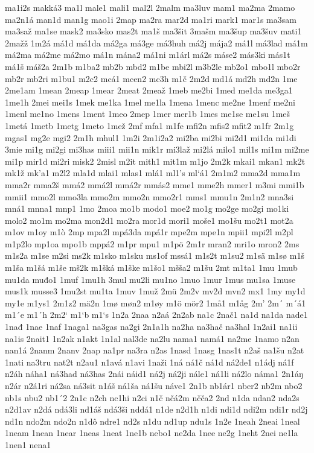 ma1i2s
makká3
ma1l
male1
mali1
mal2l
2malm
ma3luv
mam1
ma2ma
2mamo
ma2n1á
man1d
man1g
mao1i
2map
ma2ra
mar2d
ma1ri
mark1
mar1s
ma3sam
ma3saž
ma1se
mask2
ma3sko
mas2t
ma1š
ma3šit
3mašm
ma3šup
ma3šuv
mati1
2mažž
1m2á
má1d
má1da
má2ga
má3ge
má3huh
má2j
mája2
má1l
má3lad
má1m
má2ma
má2me
má2mo
má1n
mána2
má1ni
m1árl
má2s
máse2
más3ki
más1t
má1š
máš2a
2m1b
m1ba2
mb2b
mbd2
m1be
mbi2l
m3b2le
mb2o1
mbo1l
mbo2r
mb2r
mb2ri
m1bu1
m2c2
mcá1
mcen2
mc3h
m1č
2m2d
md1á
md2h
md2n
1me
2me1am
1mean
2meap
1mear
2meat
2meaž
1meb
me2bi
1med
me1da
me3ga1
1me1h
2mei
mei1s
1mek
me1ka
1mel
me1la
1mena
1menc
me2ne
1menf
me2ni
1menl
me1no
1mens
1ment
1meo
2mep
1mer
mer1b
1mes
me1se
me1su
1meš
1metá
1metb
1metg
1meto
1mež
2mf
mfa1
m1fe
mfi2n
mfis2
mfit2
m1fr
2m1g
mgas1
mg2e
mgi2
2m1h
mhul1
1m2i
2m1i2a2
mi2ba
mi2bi
mi2d1
mi1da
mi1di
3mie
mi1g
mi2gi
mi3has
miii1
mii1n
mik1r
mi3laž
mi2lá
milo1
mil1s
mi1m
mi2me
mi1p
mir1d
mi2ri
misk2
2misl
m2it
mith1
mit1m
m1jo
2m2k
mkai1
mkan1
mk2t
mk1ž
mk'a1
m2l2
mla1d
mlai1
mlas1
mlá1
ml1's
ml`á1
2m1m2
mma2d
mma1m
mma2r
mma2š
mmá2
mmá2l
mmá2r
mmás2
mme1
mme2h
mmer1
m3mi
mmi1b
mmii1
mmo2l
mmo3la
mmo2m
mmo2n
mmo2r1
mms1
mmu1n
2m1n2
mna3si
mná1
mnna1
mnp1
1mo
2moa
mo1b
modo1
moe2
mo1g
mo2ge
mo2gi
mo1ki
molo2
mo1m
mo2ma
mon2d1
mo2ra
mor1d
mori1
moše1
mo1šu
mo2t1
mot2a
m1ov
m1oy
m1ò
2mp
mpa2l
mpá3da
mpá1r
mpe2m
mpe1n
mpii1
mpi2l
m2pl
m1p2lo
mp1oa
mpo1b
mppá2
m1pr
mpu1
m1pö
2m1r
mran2
mri1o
mron2
2ms
m1s2a
m1se
m2si
ms2k
m1sko
m1sku
ms1of
mssá1
m1s2t
m1su2
m1sä
m1sø
m1š
m1ša
m1šá
m1še
mš2k
m1šká
m1ške
m1šo1
mšša2
m1šu
2mt
m1ta1
1mu
1mub
mu1da
muđo1
1muf
1mu1h
3mul
mu2li
mu1no
1muo
1mur
1mus
mu1sa
1muse
mus1k
musse3
1mu2st
mu1ta
1muv
1muž
2mü
2m2v
mv2d
mvn2
mx1
1my
my1d
my1e
m1ys1
2m1z2
mä2n
1mø
møn2
m1øy
m1ö
mör2
1må1
m1åg
2m'
2m´
m´á1
m1´e
m1´h
2m2`
m1`b
m1`s
1n2a
2naa
n2aá
2n2ab
na1c
2nač1
na1d
na1da
nade1
1nađ
1nae
1naf
1naga1
na3gas
na2gi
2n1a1h
na2ha
na3hač
na3hal
1n2ai1
na1ii
na1is
2nait1
1n2ak
n1akt
1n1al
nal3de
na2lu
nama1
namá1
na2me
1namo
n2an
nan1á
2nanm
2nanv
2nap
na1pr
na3ra
n2as
1nasd
1nasg
1nas1t
n2aš
na1šu
n2at
1nati
na3tru
nat2t
n2au1
n1avá
n1avi
1naži
1ná
ná1č
ná1d
ná2de1
n1ádj
ná1f
n2áh
náha1
ná3had
ná3has
2nái
náid1
ná2j
ná2ji
nále1
ná1li
ná2lo
náma1
2n1áŋ
n2ár
n2á1ri
ná2sa
ná3sit
n1áš
ná1ša
ná1šu
náve1
2n1b
nb1ár1
nber2
nb2m
nbo2
nb1s
nbu2
nb1´2
2n1c
n2ch
nc1hi
n2ci
n1č
nčá2m
nčča2
2nd
n1da
ndan2
nda2s
n2d1av
n2dá
ndá3li
nd1áš
ndá3ši
nddá1
n1de
n2d1h
n1di
ndi1d
ndi2m
ndi1r
nd2j
nd1n
ndo2m
ndo2n
n1dô
ndre1
nd2s
n1du
nd1up
ndu1s
1n2e
1neah
2neai
1neal
1neam
1nean
1near
1neas
1neat
1ne1b
nebo1
ne2da
1nee
ne2g
1neht
2nei
ne1la
1nen1
nena1
